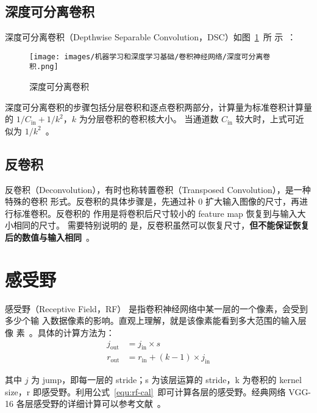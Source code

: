 \subsection{深度可分离卷积}

深度可分离卷积（Depthwise Separable Convolution，DSC）如图~\ref{fig:ds-conv}~所
示~：

\begin{figure}[ht]
  \centering
  \texttt{[image: images/机器学习和深度学习基础/卷积神经网络/深度可分离卷积.png]}
  \caption{深度可分离卷积}\label{fig:ds-conv}
\end{figure}

深度可分离卷积的步骤包括分层卷积和逐点卷积两部分，计算量为标准卷积计算量的 $ 1 /
C_{\mathrm{in}} + 1/k^2 $，$k$ 为分层卷积的卷积核大小。
当通道数 $C_{\mathrm{in}}$ 较大时，上式可近似为 $1 / k^2$~。

\subsection{反卷积}\label{subsec:deconv}
反卷积（Deconvolution），有时也称转置卷积（Transposed Convolution），是一种特殊的卷积
形式。反卷积的具体步骤是，先通过补 0 扩大输入图像的尺寸，再进行标准卷积。反卷积的
作用是将卷积后尺寸较小的 feature map 恢复到与输入大小相同的尺寸。 需要特别说明的
是，反卷积虽然可以恢复尺寸，\textbf{但不能保证恢复后的数值与输入相同}~。

\section{感受野}

感受野（Receptive Field，RF） 是指卷积神经网络中某一层的一个像素，会受到多少个输
入数据像素的影响。直观上理解，就是该像素能看到多大范围的输入层像
素~。具体的计算方法为：
\begin{align}
\label{equ:rf-cal}
j_{\mathrm {out}} & = j_{\mathrm{in}} \times s \\
r_{\mathrm {out}} & = r_{\mathrm{in}} + (k-1) \times j_{\mathrm{in}}
\end{align}

其中 $j$ 为 jump，即每一层的 stride；s 为该层运算的 stride，k 为卷积的 kernel
size，r 即感受野。利用公式~\eqref{equ:rf-cal}~即可计算各层的感受野。经典网络 VGG-16
各层感受野的详细计算可以参考文献~。

